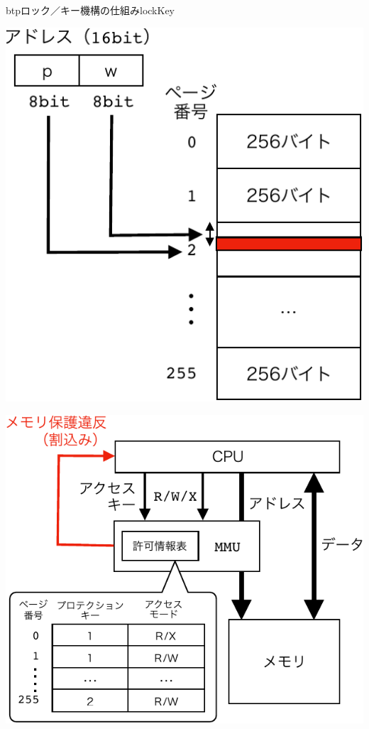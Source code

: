 \begin{myfig}{btp}{ロック／キー機構の仕組み}{lockKey}
  \begin{minipage}{0.49\columnwidth}
    \begin{center}
      \includegraphics[scale=0.66]{Fig/lockKeyAddrSpace-crop.pdf}
      \label{fig:lockKeyAddrSpace}
    \end{center}
  \end{minipage}
  \begin{minipage}{0.49\columnwidth}
    \begin{center}
      \includegraphics[scale=0.66]{Fig/lockKeyHardware-crop.pdf}
      \label{fig:lockKeyHardware}
    \end{center}
  \end{minipage}
\end{myfig}

